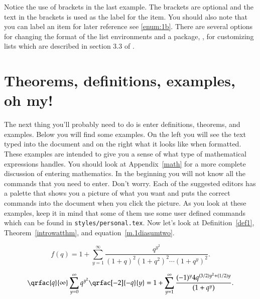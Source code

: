 Notice the use of brackets in the last example. The brackets are optional and the text in the brackets is used as the label for the item. You should also note that you can label an item for later reference see \ref{enum:1b}. There are several options for changing the format of the list environments and a package, , for customizing lists which are described in section 3.3 of \citet{mgbcr04}.

\section{Theorems, definitions, examples, oh my!}
The next thing you'll probably need to do is enter definitions, theorems, and examples. Below you will find some examples. On the left you will see the text typed into the document and on the right what it looks like when formatted. These examples are intended to give you a sense of what type of mathematical expressions \lt handles. You should look at Appendix~\ref{math} for a more complete discussion of entering mathematics. In the beginning you will not know all the commands that you need to enter. Don't worry. Each of the suggested editors has a palette that shows you a picture of what you want and puts the correct commands into the document when you click the picture. As you look at these examples, keep it in mind that some of them use some user defined commands which can be found in \verb|styles/personal.tex|. Now let's look at Definition~\ref{def1}, Theorem~\ref{introwatthm}, and equation~\ref{m.1diasumtwo}.

\begin{singlespace}
\begin{example}
\begin{defn}\label{def1}
 \begin{equation}\label{introf(q)} 
 f(q)=1+\sum_{y=1}^{\infty}
 \frac{q^{y^2}}{(1+q)^2(1+q^2)^2
 \cdots (1+q^y)^2}.
 \end{equation}\end{defn}
\end{example}
\end{singlespace}

\begin{singlespace}
\begin{example}
\begin{thm}\label{introwatthm}
\begin{equation}\label{introf}
\qrfac{q}{\infty}
\sum_{y=0}^{\infty} q^{y^2}
 \qrfac[-2]{- q}{y}=1+
 \sum_{y=1}^{\infty}
 \frac{(-1)^{y}
 4q^{(3/2)y^2+
 (1/2)y}}{(1+q^{y})}.
 \end{equation}\end{thm}
\end{example}
\end{singlespace}

